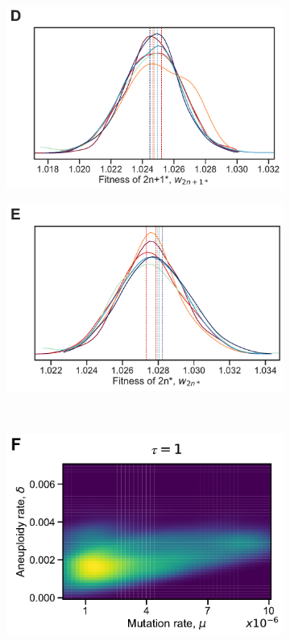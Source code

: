 \documentclass[12pt]{extarticle}
\begin{document}
\begin{figure}[p]
\begin{subfigure}{0.325\textwidth}
  \end{subfigure}
    \begin{subfigure}{0.325\textwidth}
      \includegraphics[width=\textwidth]{../figures/tau-D.pdf}      
  \end{subfigure}
    \begin{subfigure}{0.325\textwidth}
      \includegraphics[width=\textwidth]{../figures/tau-E.pdf}      
  \end{subfigure}
  \\
  \begin{subfigure}{0.325\textwidth}
      \includegraphics[width=\textwidth]{../figures/tau-joint-F.pdf}      

\end{subfigure}
\end{figure}
\end{document}
